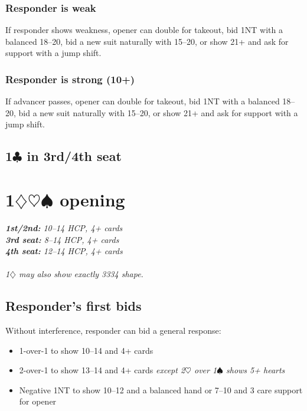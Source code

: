 \documentclass[a4paper, twoside, 11pt]{article}
\begin{document}
\begin{multicols}{3}
\subsubsection*{Responder is weak}
If responder shows weakness, opener can double for takeout, bid 1NT with a balanced 18--20, bid a new suit naturally with 15--20, or show 21+ and ask for support with a jump shift.

\subsubsection*{Responder is strong (10+)}
If advancer passes, opener can double for takeout, bid 1NT with a balanced 18--20, bid a new suit naturally with 15--20, or show 21+ and ask for support with a jump shift.






 \subsection*{1$\clubsuit$ in 3rd/4th seat}





\section{1$\diamondsuit\heartsuit\spadesuit$ opening}


\emph{\textbf{1st/2nd:} 10--14 HCP, 4+ cards \\ \textbf{3rd seat:} 8--14 HCP, 4+ cards \\ \textbf{4th seat:} 12--14 HCP, 4+ cards \\ \\
1$\diamondsuit$ may also show exactly 3334 shape.}

\subsection*{Responder's first bids}

Without interference, responder can bid a general response:
\begin{itemize}
    \item 1-over-1 to show 10--14 and 4+ cards
    \item 2-over-1 to show 13--14 and 4+ cards \textit{except 2$\heartsuit$ over 1$\spadesuit$ shows 5+ hearts}
    \item Negative 1NT to show 10--12 and a balanced hand or 7--10 and 3 care support for opener
\end{itemize}


\end{multicols}
\end{document}
